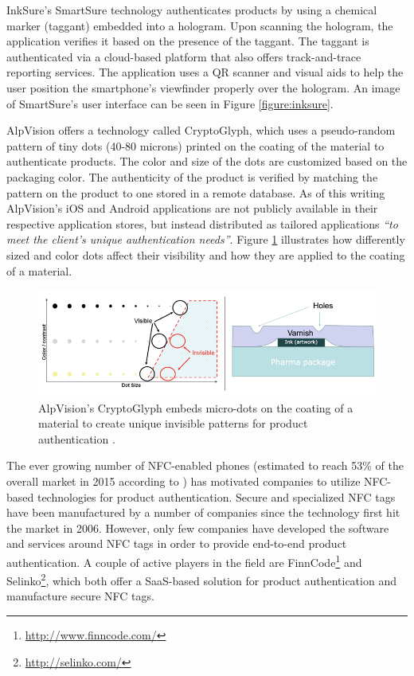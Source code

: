 \documentclass[thesis.tex]{subfiles}
\begin{document}
InkSure's SmartSure technology authenticates products by using a chemical marker (taggant) embedded into a hologram. Upon scanning the hologram, the application verifies it based on the presence of the taggant. The taggant is authenticated via a cloud-based platform that also offers track-and-trace reporting services. The application uses a QR scanner and visual aids to help the user position the smartphone's viewfinder properly over the hologram. \cite{inksure} An image of SmartSure's user interface can be seen in Figure \ref{figure:inksure}.

AlpVision offers a technology called CryptoGlyph\textregistered, which uses a pseudo-random pattern of tiny dots (40-80 microns) printed on the coating of the material to authenticate products. The color and size of the dots are customized based on the packaging color. The authenticity of the product is verified by matching the pattern on the product to one stored in a remote database. As of this writing AlpVision's iOS and Android applications are not publicly available in their respective application stores, but instead distributed as tailored applications \textit{``to meet the client's unique authentication needs''}. \cite{alpvision} Figure \ref{figure:alpvision} illustrates how differently sized and color dots affect their visibility and how they are applied to the coating of a material.

\begin{figure}[hb]
\centering \includegraphics[width=\textwidth]{images/existing_solutions/cryptoglyph}
\caption{AlpVision's CryptoGlyph\textregistered{} embeds micro-dots on the coating of a material to create unique invisible patterns for product authentication \cite{alpvision}. \label{figure:alpvision}}
\end{figure}

The ever growing number of NFC-enabled phones (estimated to reach 53\% of the overall market in 2015 according to \cite{frost-sullivan}) has motivated companies to utilize NFC-based technologies for product authentication. Secure and specialized NFC tags have been manufactured by a number of companies since the technology first hit the market in 2006. However, only few companies have developed the software and services around NFC tags in order to provide end-to-end product authentication. A couple of active players in the field are FinnCode\footnote{\url{http://www.finncode.com/}} and Selinko\footnote{\url{http://selinko.com/}}, which both offer a SaaS-based solution for product authentication and manufacture secure NFC tags.
\end{document}
